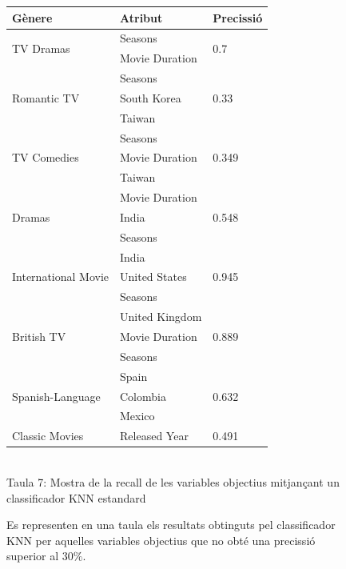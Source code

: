 \documentclass[a4paper, 11pt]{article}
\begin{document}
\begin{figure}[h]
\begin{minipage}{5cm}
\begin{center}
\end{center}
\end{minipage} %
\hspace{2em}
\begin{minipage}{9cm} %
\begin{center}
    \begin{tabular}{l|l|l}
        \textbf{Gènere} & \textbf{Atribut} & \textbf{Precissió}\\\hline\hline
            \multirow{2}{*}{TV Dramas} &  Seasons & \multirow{2}{*}{0.7} \\
            & Movie Duration& \\ \hline
        \multirow{3}{*}{Romantic TV} &  Seasons & \multirow{3}{*}{0.33} \\
        & South Korea & \\
            & Taiwan & \\ \hline
        \multirow{3}{*}{TV Comedies} &  Seasons & \multirow{3}{*}{0.349} \\
        & Movie Duration & \\
        & Taiwan & \\ \hline
        \multirow{3}{*}{Dramas} &  Movie Duration & \multirow{3}{*}{0.548} \\
        & India & \\ 
        & Seasons & \\\hline
        \multirow{3}{*}{International Movie} &  India & \multirow{3}{*}{0.945} \\
            & United States & \\
            & Seasons & \\ \hline
        \multirow{3}{*}{British TV} &  United Kingdom & \multirow{3}{*}{0.889} \\
            & Movie Duration & \\
            & Seasons & \\ \hline
        \multirow{3}{*}{Spanish-Language} &  Spain & \multirow{3}{*}{0.632} \\
            & Colombia & \\
            & Mexico & \\ \hline
        Classic Movies & Released Year & 0.491 \\
    \end{tabular}
    \label{tab:afins}
    \\
    Taula 7: Mostra de la recall de les variables objectius mitjançant un classificador KNN estandard   \setcounter{table}{7}
\end{center}
Es representen en una taula els resultats obtinguts pel classificador KNN per aquelles variables objectius que no obté una precissió superior al $30\%$.
\end{minipage} %
\end{figure} %
\end{document}
